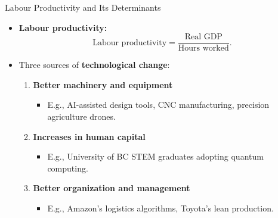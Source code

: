 \documentclass[aspectratio=169]{beamer}
\begin{document}
\begin{frame}{Labour Productivity and Its Determinants}
\transfade
\begin{itemize}[<+->]
  \item \textbf{Labour productivity:}
  \[
    \text{Labour productivity} = \frac{\text{Real GDP}}{\text{Hours worked}}.
  \]
  \item Three sources of \textbf{technological change}:
  \begin{enumerate}[<+->]
    \item \textbf{Better machinery and equipment}
    \begin{itemize}[<+->]
      \item E.g., AI-assisted design tools, CNC manufacturing, precision agriculture drones.
    \end{itemize}
    \item \textbf{Increases in human capital}
    \begin{itemize}[<+->]
      \item E.g., University of BC STEM graduates adopting quantum computing.
    \end{itemize}
    \item \textbf{Better organization and management}
    \begin{itemize}[<+->]
      \item E.g., Amazon's logistics algorithms, Toyota's lean production.
    \end{itemize}
  \end{enumerate}
\end{itemize}
\end{frame}
\end{document}

